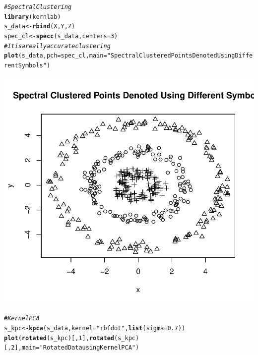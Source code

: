 \documentclass{article}\usepackage[]{graphicx}\usepackage[]{color}
\makeatletter
\def\maxwidth{ %
  \ifdim\Gin@nat@width>\linewidth
    \linewidth
  \else
    \Gin@nat@width
  \fi
}
\newcommand{\hlnum}[1]{\textcolor[rgb]{0.686,0.059,0.569}{#1}}%
\newcommand{\hlstr}[1]{\textcolor[rgb]{0.192,0.494,0.8}{#1}}%
\newcommand{\hlcom}[1]{\textcolor[rgb]{0.678,0.584,0.686}{\textit{#1}}}%
\newcommand{\hlstd}[1]{\textcolor[rgb]{0.345,0.345,0.345}{#1}}%
\newcommand{\hlkwb}[1]{\textcolor[rgb]{0.69,0.353,0.396}{#1}}%
\newcommand{\hlkwc}[1]{\textcolor[rgb]{0.333,0.667,0.333}{#1}}%
\newcommand{\hlkwd}[1]{\textcolor[rgb]{0.737,0.353,0.396}{\textbf{#1}}}%
\newenvironment{kframe}{%
 \def\at@end@of@kframe{}%
 \ifinner\ifhmode%
  \def\at@end@of@kframe{\end{minipage}}%
  \begin{minipage}{\columnwidth}%
 \fi\fi%
 \def\FrameCommand##1{\hskip\@totalleftmargin \hskip-\fboxsep
 \colorbox{shadecolor}{##1}\hskip-\fboxsep
     \hskip-\linewidth \hskip-\@totalleftmargin \hskip\columnwidth}%
 \MakeFramed {\advance\hsize-\width
   \@totalleftmargin\z@ \linewidth\hsize
   \@setminipage}}%
 {\par\unskip\endMakeFramed%
 \at@end@of@kframe}
\newenvironment{knitrout}{}{} %
\makeatother
\begin{document}
\begin{knitrout}
{}


\begin{kframe}\begin{alltt}
\hlcom{# Spectral Clustering}
\hlkwd{library}\hlstd{(kernlab)}
\hlstd{s_data} \hlkwb{<-} \hlkwd{rbind}\hlstd{(X, Y, Z)}
\hlstd{spec_cl} \hlkwb{<-} \hlkwd{specc}\hlstd{(s_data,} \hlkwc{centers} \hlstd{=} \hlnum{3}\hlstd{)}
\hlcom{# It is a really accurate clustering}
\hlkwd{plot}\hlstd{(s_data,} \hlkwc{pch} \hlstd{= spec_cl,} \hlkwc{main} \hlstd{=} \hlstr{"Spectral Clustered Points Denoted Using Different Symbols"}\hlstd{)}
\end{alltt}
\end{kframe}

{\centering \includegraphics[width=\maxwidth]{figure/minimal-Problem_32} 

}


\begin{kframe}\begin{alltt}
\hlcom{# Kernel PCA}
\hlstd{s_kpc} \hlkwb{<-} \hlkwd{kpca}\hlstd{(s_data,} \hlkwc{kernel} \hlstd{=} \hlstr{"rbfdot"}\hlstd{,} \hlkwd{list}\hlstd{(}\hlkwc{sigma} \hlstd{=} \hlnum{0.7}\hlstd{))}
\hlkwd{plot}\hlstd{(}\hlkwd{rotated}\hlstd{(s_kpc)[,} \hlnum{1}\hlstd{],} \hlkwd{rotated}\hlstd{(s_kpc)[,} \hlnum{2}\hlstd{],} \hlkwc{main} \hlstd{=} \hlstr{"Rotated Data using Kernel PCA"}\hlstd{)}
\end{alltt}
\end{kframe}


\end{knitrout}
\end{document}
